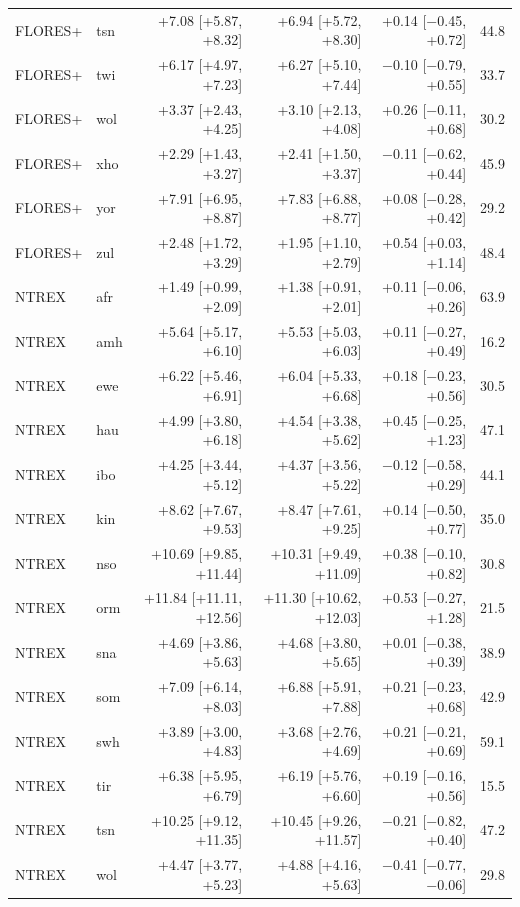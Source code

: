 {\begin{longtable}{@{}llrrrr@{}}
FLORES+ & tsn & +7.08 [+5.87, +8.32] & +6.94 [+5.72, +8.30] & +0.14 [$-$0.45, +0.72] & 44.8 \\
FLORES+ & twi & +6.17 [+4.97, +7.23] & +6.27 [+5.10, +7.44] & $-$0.10 [$-$0.79, +0.55] & 33.7 \\
FLORES+ & wol & +3.37 [+2.43, +4.25] & +3.10 [+2.13, +4.08] & +0.26 [$-$0.11, +0.68] & 30.2 \\
FLORES+ & xho & +2.29 [+1.43, +3.27] & +2.41 [+1.50, +3.37] & $-$0.11 [$-$0.62, +0.44] & 45.9 \\
FLORES+ & yor & +7.91 [+6.95, +8.87] & +7.83 [+6.88, +8.77] & +0.08 [$-$0.28, +0.42] & 29.2 \\
FLORES+ & zul & +2.48 [+1.72, +3.29] & +1.95 [+1.10, +2.79] & +0.54 [+0.03, +1.14] & 48.4 \\
NTREX & afr & +1.49 [+0.99, +2.09] & +1.38 [+0.91, +2.01] & +0.11 [$-$0.06, +0.26] & 63.9 \\
NTREX & amh & +5.64 [+5.17, +6.10] & +5.53 [+5.03, +6.03] & +0.11 [$-$0.27, +0.49] & 16.2 \\
NTREX & ewe & +6.22 [+5.46, +6.91] & +6.04 [+5.33, +6.68] & +0.18 [$-$0.23, +0.56] & 30.5 \\
NTREX & hau & +4.99 [+3.80, +6.18] & +4.54 [+3.38, +5.62] & +0.45 [$-$0.25, +1.23] & 47.1 \\
NTREX & ibo & +4.25 [+3.44, +5.12] & +4.37 [+3.56, +5.22] & $-$0.12 [$-$0.58, +0.29] & 44.1 \\
NTREX & kin & +8.62 [+7.67, +9.53] & +8.47 [+7.61, +9.25] & +0.14 [$-$0.50, +0.77] & 35.0 \\
NTREX & nso & +10.69 [+9.85, +11.44] & +10.31 [+9.49, +11.09] & +0.38 [$-$0.10, +0.82] & 30.8 \\
NTREX & orm & +11.84 [+11.11, +12.56] & +11.30 [+10.62, +12.03] & +0.53 [$-$0.27, +1.28] & 21.5 \\
NTREX & sna & +4.69 [+3.86, +5.63] & +4.68 [+3.80, +5.65] & +0.01 [$-$0.38, +0.39] & 38.9 \\
NTREX & som & +7.09 [+6.14, +8.03] & +6.88 [+5.91, +7.88] & +0.21 [$-$0.23, +0.68] & 42.9 \\
NTREX & swh & +3.89 [+3.00, +4.83] & +3.68 [+2.76, +4.69] & +0.21 [$-$0.21, +0.69] & 59.1 \\
NTREX & tir & +6.38 [+5.95, +6.79] & +6.19 [+5.76, +6.60] & +0.19 [$-$0.16, +0.56] & 15.5 \\
NTREX & tsn & +10.25 [+9.12, +11.35] & +10.45 [+9.26, +11.57] & $-$0.21 [$-$0.82, +0.40] & 47.2 \\
NTREX & wol & +4.47 [+3.77, +5.23] & +4.88 [+4.16, +5.63] & $-$0.41 [$-$0.77, $-$0.06] & 29.8 \\

\end{longtable}}
